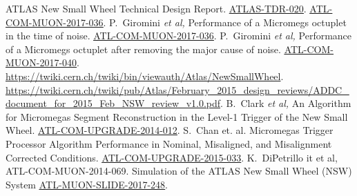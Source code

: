 \begin{thebibliography}{99}
\label{bibliography}
\setlength{\itemsep}{1.5pt plus 2.0pt minus 1.4pt}
\setlength{\parsep}{0pt}
\setlength{\parskip}{0pt}
\vspace{-6pt}
 ATLAS New Small Wheel Technical Design Report. \href{http://cds.cern.ch/record/1552862}{\color{blue}\underline{ATLAS-TDR-020}}.
 \href{https://cds.cern.ch/record/2272355}{\color{blue}\underline{ATL-COM-MUON-2017-036}}.
 P.~Giromini {\it et al,} Performance of a Micromegs octuplet in the time  of noise.
 \href{https://cds.cern.ch/record/2277316}{\color{blue}\underline{ATL-COM-MUON-2017-036}}.
 P.~Giromini  {\it et al,} Performance of a Micromegs octuplet after removing the major cause of noise.
 \href{https://cds.cern.ch/record/2277316}{\color{blue}\underline{ATL-COM-MUON-2017-040}}.
 \url{https://twiki.cern.ch/twiki/bin/viewauth/Atlas/NewSmallWheel}.
 \url{https://twiki.cern.ch/twiki/pub/Atlas/February_2015_design_reviews/ADDC_document_for_2015_Feb_NSW_review_v1.0.pdf}.
 B.~Clark {\it et al,} An Algorithm for Micromegas Segment
 Reconstruction in the Level-1 Trigger of the New Small Wheel. \href{https://cds.cern.ch/record/1706160}{\color{blue}\underline{ATL-COM-UPGRADE-2014-012}}.
 S.~Chan et. al. Micromegas Trigger Processor Algorithm Performance in Nominal, Misaligned, and Misalignment
 Corrected Conditions. \href{https://cds.cern.ch/record/2113121}{\color{blue}\underline{ATL-COM-UPGRADE-2015-033}}.
 K.~DiPetrillo  {it et al,} ATL-COM-MUON-2014-069.
 Simulation of the ATLAS New Small Wheel (NSW) System
 \href{http://cds.cern.ch/record/2265067}{\color{blue}\underline{ATL-MUON-SLIDE-2017-248}}.
\end{thebibliography}








